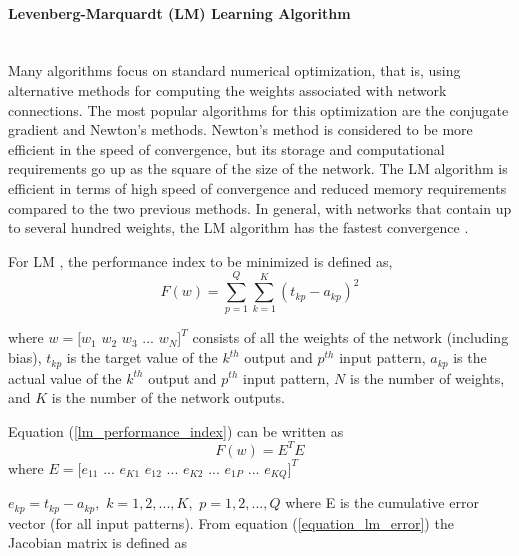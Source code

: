 \documentclass[12pt,a4paper,oneside]{article}
\numberwithin{equation}{section}
\numberwithin{algorithm}{section}
\begin{document}
	\paragraph{Levenberg-Marquardt (LM) Learning Algorithm \\\\}\label{lm_algorithm}
	
	
	 Many algorithms focus on standard numerical optimization, that is, using alternative methods for computing the weights associated with network connections. The most popular algorithms for this optimization are the conjugate gradient and Newton’s methods. Newton’s method is considered to be more efficient in the speed of convergence, but its storage and  computational requirements go up as the square of the size of the network.
	The LM algorithm is efficient in terms of high speed of convergence and reduced memory requirements compared to the two previous methods. In general, with networks that contain up to several hundred weights, the LM algorithm has the fastest convergence \cite{Hagan1994}.
	
	For LM , the performance index to be minimized is defined as,
	\begin{equation}\label{lm_performance_index}
	F(w)=\sum\limits_{p=1}^{Q}{\sum\limits_{k=1}^{K}(t_{kp}-a_{kp})^2}
	\end{equation}
	
	where $w=[w_1 $ $ w_2 $ $ w_3 $ $ ...$ $  w_N]^T$ consists of all the weights of the network (including bias), $t_{kp}$ is the target value of the $k^{th}$ output and $p^{th}$ input pattern, $a_{kp}$ is the actual value of the $k^{th}$ output and $p^{th}$ input pattern, $N$ is the number of weights, and $K$ is the number of the network outputs.
	
	Equation (\ref{lm_performance_index}) can be written as
	\begin{equation}\label{equation_lm_error}
	F(w)=E^TE
	\end{equation}
	where
	$ E=[e_{11}$ $...$ $ e_{K1} $ $ e_{12}$ $...$ $ e_{K2}$ $ ...$ $ e_{1P} $ $...$ $ e_{KQ}]^T$
	
	$ e_{kp}=t_{kp}-a_{kp}, $ $ k=1,2,...,K, $ $ p=1,2,...,Q$
	where E is the cumulative error vector (for all input patterns).
	From equation (\ref{equation_lm_error}) the Jacobian matrix is defined as
	
\end{document}
